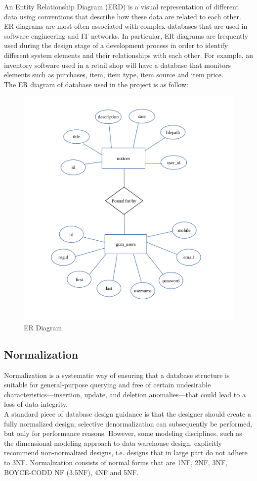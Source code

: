 An Entity Relationship Diagram (ERD) is a visual representation of different data using conventions that describe how these data are related to each other. ER diagrams are most often associated with complex databases that are used in software engineering and IT networks. In particular, ER diagrams are frequently used during the design stage of a development process in order to identify different system elements and their relationships with each other. For example, an inventory software used in a retail shop will have a database that monitors elements such as purchases, item, item type, item source and item price.\\
The ER diagram of database used in the project is as follow:
\begin{figure}[H]
\centering \includegraphics[scale=0.9]{image/erdiagram.png}
\caption{ER Diagram}
\end{figure}

\subsection{Normalization}
Normalization is a systematic way of ensuring that a database structure is suitable for general-purpose querying and free of certain undesirable characteristics—insertion, update, and deletion anomalies—that could lead to a loss of data integrity.
\\
A standard piece of database design guidance is that the designer should create a fully normalized design; selective denormalization can subsequently be performed, but only for performance reasons. However, some modeling disciplines, such as the dimensional modeling approach to data warehouse design, explicitly recommend non-normalized designs, i.e. designs that in large part do not adhere to 3NF. Normalization consists of normal forms that are 1NF, 2NF, 3NF, BOYCE-CODD NF (3.5NF), 4NF and 5NF.

